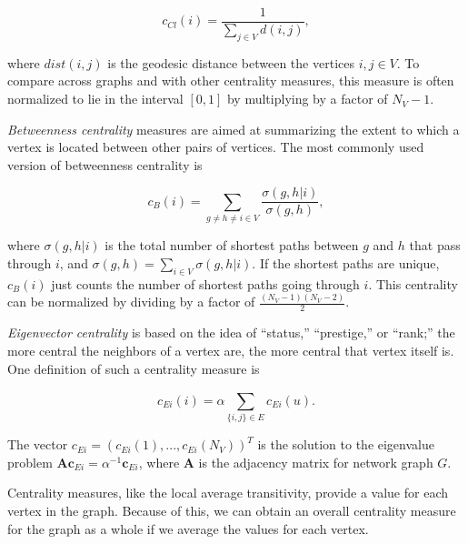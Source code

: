 \documentclass[12pt,twoside]{amherstthesis}
\begin{document}
  \[c_{Cl}(i) = \frac {1} {\sum_{j \in V}^{} d(i, j)},\]
  
  where \(dist(i,j)\) is the geodesic distance between the vertices
  \(i,j \in V\). To compare across graphs and with other centrality
  measures, this measure is often normalized to lie in the interval
  \([0,1]\) by multiplying by a factor of \(N_V - 1\).
  
  \emph{Betweenness centrality} measures are aimed at summarizing the
  extent to which a vertex is located between other pairs of vertices. The
  most commonly used version of betweenness centrality is
  
  \[c_{B}(i) = \sum_{g \neq h \neq i \in V}^{} \frac {\sigma(g,h|i)} {\sigma(g,h)},\]
  
  where \(\sigma(g,h|i)\) is the total number of shortest paths between
  \(g\) and \(h\) that pass through \(i\), and
  \(\sigma(g,h) = \sum_{i \in V}^{} \sigma(g,h|i)\). If the shortest paths
  are unique, \(c_{B}(i)\) just counts the number of shortest paths going
  through \(i\). This centrality can be normalized by dividing by a factor
  of \(\frac {(N_V - 1)(N_V - 2)} {2}\).
  
  \emph{Eigenvector centrality} is based on the idea of ``status,''
  ``prestige,'' or ``rank;'' the more central the neighbors of a vertex
  are, the more central that vertex itself is. One definition of such a
  centrality measure is
  
  \[c_{Ei}(i) = \alpha \sum_{\{i,j\} \in E}^{} c_{Ei} (u).\]
  
  The vector \(c_{Ei} = (c_{Ei}(1), ..., c_{Ei}(N_V))^T\) is the solution
  to the eigenvalue problem
  \(\textbf{A}\textbf{c}_{Ei} = \alpha^{-1}\textbf{c}_{Ei}\), where
  \(\textbf{A}\) is the adjacency matrix for network graph \(G\).
  
  Centrality measures, like the local average transitivity, provide a
  value for each vertex in the graph. Because of this, we can obtain an
  overall centrality measure for the graph as a whole if we average the
  values for each vertex.
  
\end{document}
